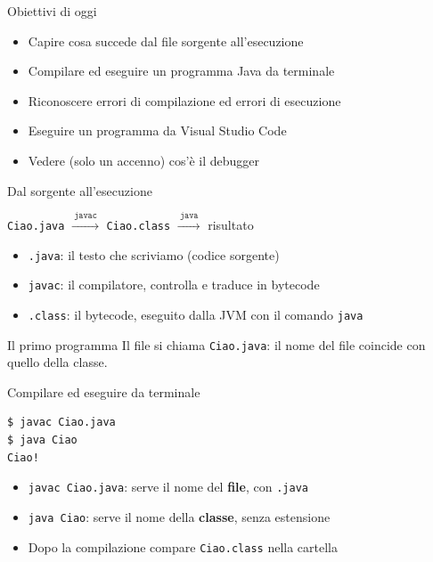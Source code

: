 \documentclass[aspectratio=169,10pt,t]{beamer}
\begin{document}

\begin{frame}{Obiettivi di oggi}
  \begin{itemize}
    \item Capire cosa succede dal file sorgente all'esecuzione
    \item Compilare ed eseguire un programma Java da terminale
    \item Riconoscere errori di compilazione ed errori di esecuzione
    \item Eseguire un programma da Visual Studio Code
    \item Vedere (solo un accenno) cos'è il debugger
  \end{itemize}
\end{frame}

\begin{frame}{Dal sorgente all'esecuzione}
  \begin{center}
    \texttt{Ciao.java} $\xrightarrow{\ \texttt{javac}\ }$ \texttt{Ciao.class} $\xrightarrow{\ \texttt{java}\ }$ risultato
  \end{center}
  \vspace{1em}
  \begin{itemize}
    \item \texttt{.java}: il testo che scriviamo (codice sorgente)
    \item \texttt{javac}: il compilatore, controlla e traduce in bytecode
    \item \texttt{.class}: il bytecode, eseguito dalla JVM con il comando \texttt{java}
  \end{itemize}
\end{frame}

\begin{frame}{Il primo programma}
  \vspace{0.5em}
  Il file si chiama \texttt{Ciao.java}: il nome del file coincide con quello della classe.
\end{frame}

\begin{frame}[fragile]{Compilare ed eseguire da terminale}
\begin{lstlisting}[language={},numbers=none]
$ javac Ciao.java
$ java Ciao
Ciao!
\end{lstlisting}
  \begin{itemize}
    \item \texttt{javac Ciao.java}: serve il nome del \textbf{file}, con \texttt{.java}
    \item \texttt{java Ciao}: serve il nome della \textbf{classe}, senza estensione
    \item Dopo la compilazione compare \texttt{Ciao.class} nella cartella
  \end{itemize}
\end{frame}
\end{document}
